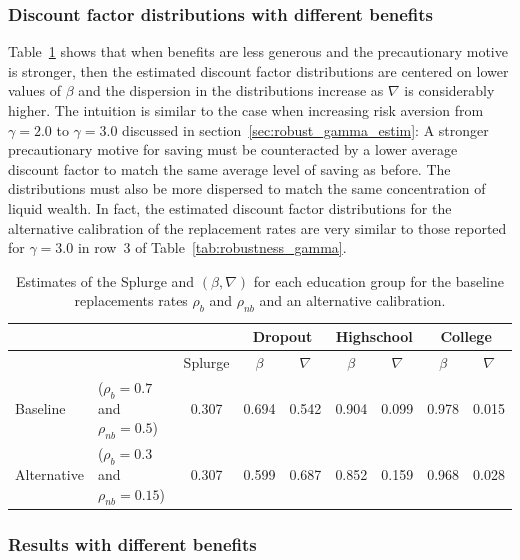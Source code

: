 \documentclass[../HAFiscal]{subfiles}
\begin{document}
\subsubsection{Discount factor distributions with different benefits}
\label{sec:robust_benefits_estim}

Table~\ref{tab:robustness_benefits} shows that when benefits are less generous and the precautionary motive is stronger, then the estimated discount factor distributions are centered on lower values of $\beta$ and the dispersion in the distributions increase as $\nabla$ is considerably higher. The intuition is similar to the case when increasing risk aversion from $\gamma=2.0$ to $\gamma=3.0$ discussed in section~\ref{sec:robust_gamma_estim}: A stronger precautionary motive for saving must be counteracted by a lower average discount factor to match the same average level of saving as before. The distributions must also be more dispersed to match the same concentration of liquid wealth. In fact, the estimated discount factor distributions for the alternative calibration of the replacement rates are very similar to those reported for $\gamma=3.0$ in row~3 of Table~\ref{tab:robustness_gamma}. 

\begin{table}[t]
\begin{center}
	\begin{tabular}{llc|cccccc} 
		\toprule
		& & & \multicolumn{2}{c}{Dropout} & \multicolumn{2}{c}{Highschool} & \multicolumn{2}{c}{College} \\ \midrule 
		& & Splurge & $\beta$ & $\nabla$ & $\beta$ & $\nabla$ & $\beta$ & $\nabla$ \\ \midrule 
		Baseline & ($\rho_{b}=0.7$ and $\rho_{nb}=0.5$) & 0.307 & 0.694 & 0.542 & 0.904 & 0.099 & 0.978 & 0.015 \\ 
		Alternative & ($\rho_{b}=0.3$ and $\rho_{nb}=0.15$) & 0.307 & 0.599 & 0.687 & 0.852 & 0.159 & 0.968 & 0.028
		\\ \bottomrule 
	\end{tabular}
\end{center}
\caption{Estimates of the Splurge and $(\beta,\nabla)$ for each education group for the baseline replacements rates $\rho_{b}$ and $\rho_{nb}$ and an alternative calibration.}
\label{tab:robustness_benefits}
\end{table}


\subsubsection{Results with different benefits}
\label{sec:robust_benefits_results}
\end{document}
